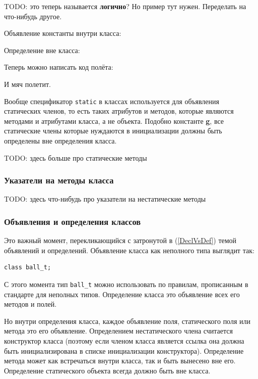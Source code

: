 \documentclass[a4paper,12pt,oneside]{article}
\begin{document}
TODO: это теперь называется \textbf{логично}? Но пример тут нужен. Переделать на что-нибудь другое.

Объявление константы внутри класса:



Определение вне класса:



Теперь можно написать код полёта:



И мяч полетит. 

Вообще спецификатор \lstinline!static! в классах используется для объявления статических членов, то есть таких атрибутов и методов, которые являются методами и атрибутами класса, а не объекта. Подобно константе \textbf{g}, все статические члены которые нуждаются в инициализации должны быть определены вне определения класса.

TODO: здесь больше про статические методы

\subsubsection{Указатели на методы класса}

TODO: здесь что-нибудь про указатели на нестатические методы

\subsubsection{Объявления и определения классов}\label{DeclDefs}

Это важный момент, перекликающийся с затронутой в (\ref{DeclVsDef}) темой объявлений и определений. Объявление класса как неполного типа выглядит так:

\begin{lstlisting}
class ball_t;
\end{lstlisting}

С этого момента тип \lstinline!ball_t! можно использовать по правилам, прописанным в стандарте для неполных типов. Определение класса это объявление всех его методов и полей.

Но внутри определения класса, каждое объявление поля, статического поля или метода это его объявление. Определением нестатического члена считается конструктор класса (поэтому если членом класса является ссылка она должна быть инициализирована в списке инициализации конструктора). Определение метода может как встречаться внутри класса, так и быть вынесено вне его. Определение статического объекта всегда должно быть вне класса.
\end{document}
